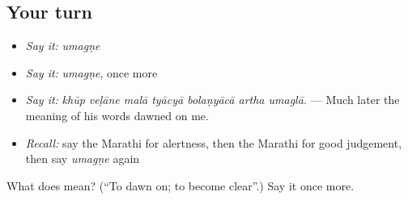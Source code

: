 \subsection*{Your turn}
\begin{itemize}
\raggedright
  \item \emph{Say it:} \emph{umagṇe}
  \item \emph{Say it:} \emph{umagṇe}, once more
  \item \emph{Say it:} \emph{khūp veḷāne malā tyācyā bolaṇyācā artha umaglā.} — Much later the meaning of his words dawned on me.
  \item \emph{Recall:} say the Marathi for alertness, then the Marathi for good judgement, then say \emph{umagṇe} again
\end{itemize}

\begin{tcolorbox}[breakable,colback=teal!4,colframe=teal!35!black,title={Before you move on}]
What does  mean? (\textquotedblleft{}To dawn on; to become clear\textquotedblright{}.) Say it once more.
\end{tcolorbox}
